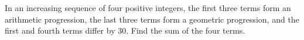 In an increasing sequence of four positive integers, the first three terms form an arithmetic progression, the last three terms form a geometric progression, and the first and fourth terms differ by 30.  Find the sum of the four terms.